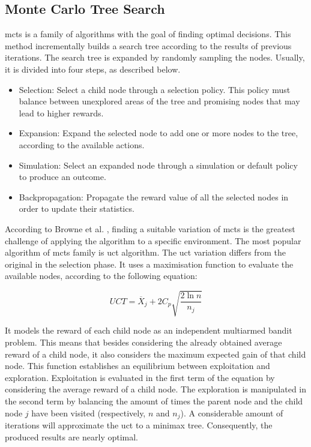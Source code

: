 \subsection{Monte Carlo Tree Search}


\gls{mcts} is a family of algorithms with the goal of finding optimal decisions.
This method incrementally builds a search tree according to the results of previous iterations.
The search tree is expanded by randomly sampling the nodes.
Usually, it is divided into four steps, as described below.
\begin{itemize}
  \item Selection: Select a child node through a selection policy. This policy must balance between unexplored areas of the tree and promising nodes that may lead to higher rewards.
  \item Expansion: Expand the selected node to add one or more nodes to the tree, according to the available actions.
  \item Simulation: Select an expanded node through a simulation or default policy to produce an outcome.
  \item Backpropagation: Propagate the reward value of all the selected nodes in order to update their statistics.
\end{itemize}

According to Browne et al. \cite{Browne2012}, finding a suitable variation of \gls{mcts} is the greatest challenge of applying the algorithm to a specific environment.
The most popular algorithm of \gls{mcts} family is \gls{uct} algorithm.
The \gls{uct} variation differs from the original in the selection phase.
It uses a maximisation function to evaluate the available nodes, according to the following equation:

\begin{equation}
    UCT = \overline{X}_j + 2C_p\sqrt{\frac{2\ln n}{n_j}}
\end{equation}

It models the reward of each child node as an independent multiarmed bandit problem.
This means that besides considering the already obtained average reward of a child node, it also considers the maximum expected gain of that child node.
This function establishes an equilibrium between exploitation and exploration.
Exploitation is evaluated in the first term of the equation by considering the average reward of a child node.
The exploration is manipulated in the second term by balancing the amount of times the parent node and the child node $j$ have been visited (respectively, $n$ and $n_j$).
A considerable amount of iterations will approximate the \gls{uct} to a minimax tree.
Consequently, the produced results are nearly optimal.

 